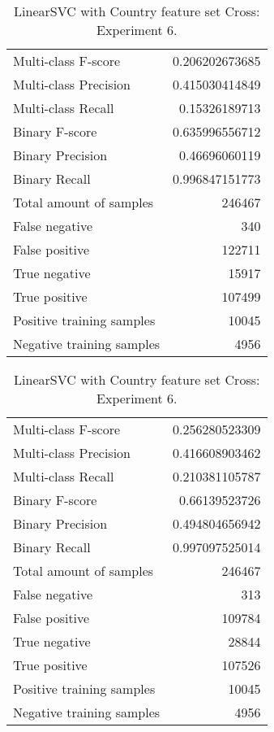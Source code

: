 \begin{table}[H]
\begin{minipage}{0.5\textwidth}
\caption{LinearSVC with Country feature set Cross: Experiment 5.}
\centering
\begin{tabular}{l r}
\toprule
Multi-class F-score & 0.206202673685 \\
Multi-class Precision & 0.415030414849 \\
Multi-class Recall & 0.15326189713 \\
\midrule
Binary F-score & 0.635996556712 \\
Binary Precision & 0.46696060119 \\
Binary Recall & 0.996847151773 \\
\midrule
Total amount of samples & 246467 \\
False negative & 340 \\
False positive & 122711 \\
True negative & 15917 \\
True positive & 107499 \\
\midrule
Positive training samples & 10045 \\
Negative training samples & 4956 \\
\bottomrule
\end{tabular}
\end{minipage}
\hfillx
\begin{minipage}{0.5\textwidth}
\caption{LinearSVC with Country feature set Cross: Experiment 6.}
\centering
\begin{tabular}{l r}
\toprule
Multi-class F-score & 0.256280523309 \\
Multi-class Precision & 0.416608903462 \\
Multi-class Recall & 0.210381105787 \\
\midrule
Binary F-score & 0.66139523726 \\
Binary Precision & 0.494804656942 \\
Binary Recall & 0.997097525014 \\
\midrule
Total amount of samples & 246467 \\
False negative & 313 \\
False positive & 109784 \\
True negative & 28844 \\
True positive & 107526 \\
\midrule
Positive training samples & 10045 \\
Negative training samples & 4956 \\
\bottomrule
\end{tabular}
\end{minipage}
\end{table}
